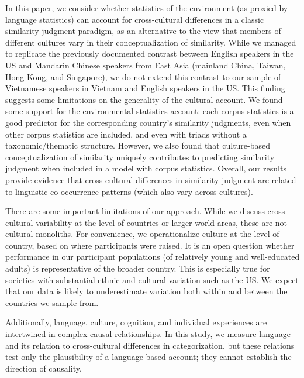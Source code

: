 \documentclass[10pt, letterpaper]{article}
\begin{document}
In this paper, we consider whether statistics of the environment (as
proxied by language statistics) can account for cross-cultural
differences in a classic similarity judgment paradigm, as an alternative
to the view that members of different cultures vary in their
conceptualization of similarity. While we managed to replicate the
previously documented contrast between English speakers in the US and
Mandarin Chinese speakers from East Asia (mainland China, Taiwan, Hong
Kong, and Singapore), we do not extend this contrast to our sample of
Vietnamese speakers in Vietnam and English speakers in the US. This
finding suggests some limitations on the generality of the cultural
account. We found some support for the environmental statistics account:
each corpus statistics is a good predictor for the corresponding
country's similarity judgments, even when other corpus statistics are
included, and even with triads without a taxonomic/thematic structure.
However, we also found that culture-based conceptualization of
similarity uniquely contributes to predicting similarity judgment when
included in a model with corpus statistics. Overall, our results provide
evidence that cross-cultural differences in similarity judgment are
related to linguistic co-occurrence patterns (which also vary across
cultures).

There are some important limitations of our approach. While we discuss
cross-cultural variability at the level of countries or larger world
areas, these are not cultural monoliths. For convenience, we
operationalize culture at the level of country, based on where
participants were raised. It is an open question whether performance in
our participant populations (of relatively young and well-educated
adults) is representative of the broader country. This is especially
true for societies with substantial ethnic and cultural variation such
as the US. We expect that our data is likely to underestimate variation
both within and between the countries we sample from.

Additionally, language, culture, cognition, and individual experiences
are intertwined in complex causal relationships. In this study, we
measure language and its relation to cross-cultural differences in
categorization, but these relations test only the plausibility of a
language-based account; they cannot establish the direction of
causality.
\end{document}
